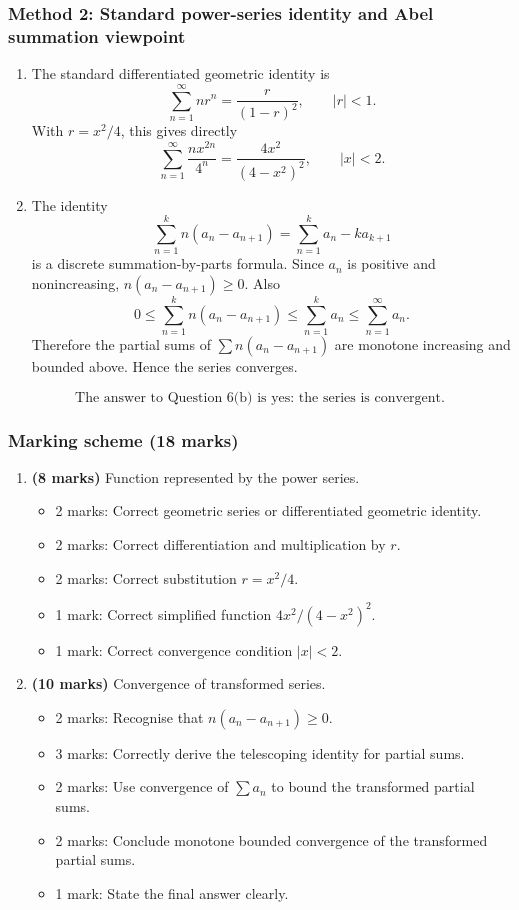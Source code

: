 \documentclass[12pt]{article}
\newcommand{\abs}[1]{\left|#1\right|}
\begin{document}
\newpage
\subsubsection{Method 2: Standard power-series identity and Abel summation viewpoint}

\begin{enumerate}[label=(\alph*)]
\item The standard differentiated geometric identity is
\[
\sum_{n=1}^{\infty}nr^n=\frac{r}{(1-r)^2},
\qquad \abs{r}<1.
\]
With $r=x^2/4$, this gives directly
\[
\boxed{\displaystyle
\sum_{n=1}^{\infty}\frac{nx^{2n}}{4^n}
=\frac{4x^2}{(4-x^2)^2},
\qquad \abs{x}<2.}
\]

\item The identity
\[
\sum_{n=1}^k n(a_n-a_{n+1})
=\sum_{n=1}^k a_n-ka_{k+1}
\]
is a discrete summation-by-parts formula. Since $a_n$ is positive and nonincreasing, $n(a_n-a_{n+1})\geq 0$. Also
\[
0\leq \sum_{n=1}^k n(a_n-a_{n+1})\leq \sum_{n=1}^k a_n\leq \sum_{n=1}^{\infty}a_n.
\]
Therefore the partial sums of $\sum n(a_n-a_{n+1})$ are monotone increasing and bounded above. Hence the series converges.
\end{enumerate}

\[
\boxed{\text{The answer to Question 6(b) is yes: the series is convergent.}}
\]

\subsubsection{Marking scheme (18 marks)}

\begin{enumerate}[label=(\alph*)]
\item \textbf{(8 marks)} Function represented by the power series.
\begin{itemize}
\item 2 marks: Correct geometric series or differentiated geometric identity.
\item 2 marks: Correct differentiation and multiplication by $r$.
\item 2 marks: Correct substitution $r=x^2/4$.
\item 1 mark: Correct simplified function $4x^2/(4-x^2)^2$.
\item 1 mark: Correct convergence condition $\abs{x}<2$.
\end{itemize}

\item \textbf{(10 marks)} Convergence of transformed series.
\begin{itemize}
\item 2 marks: Recognise that $n(a_n-a_{n+1})\geq 0$.
\item 3 marks: Correctly derive the telescoping identity for partial sums.
\item 2 marks: Use convergence of $\sum a_n$ to bound the transformed partial sums.
\item 2 marks: Conclude monotone bounded convergence of the transformed partial sums.
\item 1 mark: State the final answer clearly.
\end{itemize}
\end{enumerate}
\end{document}
